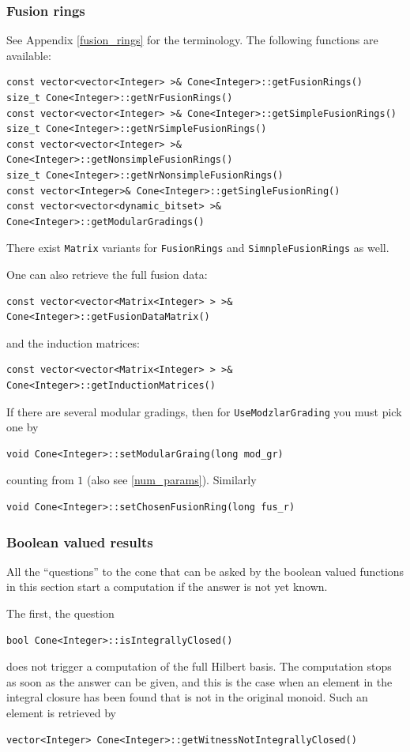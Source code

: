 \begin{small}
\subsubsection{Fusion rings}\label{lib_fusion}

See Appendix \ref{fusion_rings}  for the terminology. The following functions are available:
\begin{Verbatim}
const vector<vector<Integer> >& Cone<Integer>::getFusionRings()
size_t Cone<Integer>::getNrFusionRings() 
const vector<vector<Integer> >& Cone<Integer>::getSimpleFusionRings()
size_t Cone<Integer>::getNrSimpleFusionRings()
const vector<vector<Integer> >& Cone<Integer>::getNonsimpleFusionRings()
size_t Cone<Integer>::getNrNonsimpleFusionRings()
const vector<Integer>& Cone<Integer>::getSingleFusionRing()
const vector<vector<dynamic_bitset> >& Cone<Integer>::getModularGradings()
\end{Verbatim}
There exist \verb*|Matrix| variants for \verb*|FusionRings| and \verb*|SimnpleFusionRings| as well.

One can also retrieve the full fusion data:
\begin{Verbatim}
const vector<vector<Matrix<Integer> > >& Cone<Integer>::getFusionDataMatrix()
\end{Verbatim}
and the induction matrices:
\begin{Verbatim}
const vector<vector<Matrix<Integer> > >& Cone<Integer>::getInductionMatrices()
\end{Verbatim}

If there are several modular gradings, then for \verb*|UseModzlarGrading| you must pick one by
\begin{Verbatim}
void Cone<Integer>::setModularGraing(long mod_gr)
\end{Verbatim}
counting from $1$ (also see \ref{num_params}). Similarly
\begin{Verbatim}
void Cone<Integer>::setChosenFusionRing(long fus_r)
\end{Verbatim}

\subsubsection{Boolean valued results}

All the ``questions'' to the cone that can be asked by the boolean valued functions in this section start a computation if the answer is not yet known.

The first, the question
\begin{Verbatim}
bool Cone<Integer>::isIntegrallyClosed()
\end{Verbatim}
does not trigger a computation of the full Hilbert basis. The computation stops as soon as the answer can be given, and this is the case when an element in the integral closure has been found that is not in the original monoid. Such an element is retrieved by
\begin{Verbatim}
vector<Integer> Cone<Integer>::getWitnessNotIntegrallyClosed()
\end{Verbatim}


\end{small}
